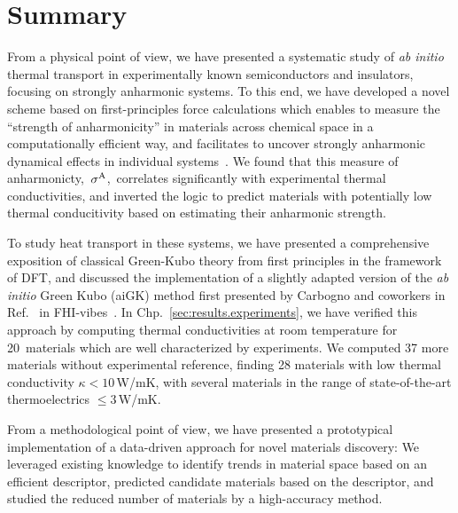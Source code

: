 \section{Summary}

From a physical point of view, we have presented a systematic study of \emph{ab initio} thermal transport in experimentally known semiconductors and insulators, focusing on strongly anharmonic systems. To this end, we have developed a novel scheme based on first-principles force calculations which enables to measure the ``strength of anharmonicity'' in materials across chemical space in a computationally efficient way, and facilitates to uncover strongly anharmonic dynamical effects in individual systems~\cite{Knoop2020}. We found that this measure of anharmonicty,~$\sigma^\mathrm{A}$,~correlates significantly with experimental thermal conductivities, and inverted the logic to predict materials with potentially low thermal conducitivity based on estimating their anharmonic strength.

To study heat transport in these systems, we have presented a comprehensive exposition of classical Green-Kubo theory from first principles in the framework of DFT, and discussed the implementation of a slightly adapted version of the \emph{ab initio} Green Kubo (aiGK) method first presented by Carbogno and coworkers in Ref.~\cite{Carbogno2016} in FHI-vibes~\cite{FHI-vibes}. In Chp.~\ref{sec:results.experiments}, we have verified this approach by computing thermal conductivities at room temperature for 20~materials which are well characterized by experiments. We computed  37 more materials without experimental reference, finding  28 materials with low thermal conductivity $\kappa < 10$\,W/mK, with several materials in the range of state-of-the-art thermoelectrics $\leq 3$\,W/mK.

From a methodological point of view, we have presented a prototypical implementation of a data-driven approach for novel materials discovery: We leveraged existing knowledge to identify trends in material space based on an efficient descriptor, predicted candidate materials based on the descriptor, and studied the reduced number of materials by a high-accuracy method.

